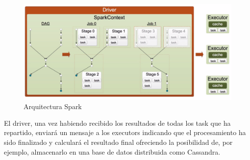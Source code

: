 \begin{figure}[h]
	\centering
	\includegraphics[width=1\textwidth]{Ilustraciones/spark_task_creation.png}
	\caption{Arquitectura Spark}
	\label{fig:spark_task_creation}
\end{figure}

El driver, una vez habiendo recibido los resultados de todas los task que ha repartido, enviará un mensaje a los executors indicando que el procesamiento ha sido finalizado y calculará el resultado final ofreciendo la posibilidad de, por ejemplo, almacenarlo en una base de datos distribuida como Cassandra.\\






